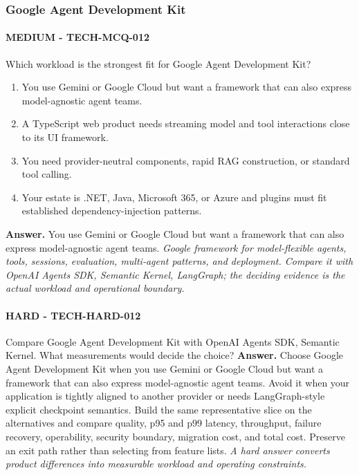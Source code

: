 \subsubsection*{Google Agent Development Kit}
\paragraph{MEDIUM - TECH-MCQ-012} Which workload is the strongest fit for Google Agent Development Kit?
\begin{enumerate}[label=\Alph*.]
\item You use Gemini or Google Cloud but want a framework that can also express model-agnostic agent teams.
\item A TypeScript web product needs streaming model and tool interactions close to its UI framework.
\item You need provider-neutral components, rapid RAG construction, or standard tool calling.
\item Your estate is .NET, Java, Microsoft 365, or Azure and plugins must fit established dependency-injection patterns.
\end{enumerate}
\textbf{Answer.} You use Gemini or Google Cloud but want a framework that can also express model-agnostic agent teams.
\textit{Google framework for model-flexible agents, tools, sessions, evaluation, multi-agent patterns, and deployment. Compare it with OpenAI Agents SDK, Semantic Kernel, LangGraph; the deciding evidence is the actual workload and operational boundary.}
\paragraph{HARD - TECH-HARD-012} Compare Google Agent Development Kit with OpenAI Agents SDK, Semantic Kernel. What measurements would decide the choice?
\textbf{Answer.} Choose Google Agent Development Kit when you use Gemini or Google Cloud but want a framework that can also express model-agnostic agent teams. Avoid it when your application is tightly aligned to another provider or needs LangGraph-style explicit checkpoint semantics. Build the same representative slice on the alternatives and compare quality, p95 and p99 latency, throughput, failure recovery, operability, security boundary, migration cost, and total cost. Preserve an exit path rather than selecting from feature lists.
\textit{A hard answer converts product differences into measurable workload and operating constraints.}
